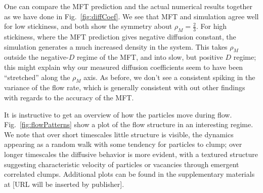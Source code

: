 \documentclass[
reprint,
 amsmath,amssymb,
 aps,
 prl,
]{revtex4-1}
\begin{document}
One can compare the MFT prediction and the actual numerical results together as we have done in Fig.~\ref{fig:diffCoef}. We see that MFT and simulation agree well for low stickiness, and both show the symmetry
about $\rho_M = \frac{2}{3}$. For high stickiness, where the MFT prediction gives negative diffusion constant, the simulation generates a much increased density in the system.  This takes $\rho_M$ outside the negative-$D$ regime of the MFT,
and into slow, but positive $D$ regime; this might explain why our measured diffusion coefficients seem to have been ``stretched'' along the $\rho_M$ axis. As before, we don't see a consistent spiking in the variance of the flow rate,
which is generally consistent with out other findings with
regards to the accuracy of the MFT.

It is instructive to get an overview of how the particles move during flow. Fig.~\ref{fig:flowPatterns} show a plot of the flow structure in an interesting regime.
We note that over short timescales little structure is visible, the dynamics appearing as a random walk with some tendency for particles to clump; over longer timescales the diffusive behavior is more evident, with a textured structure suggesting characteristic velocity of  particles or vacancies through emergent correlated clumps.
Additional plots can be found in the supplementary materials at [URL will be inserted by publisher].
\end{document}

